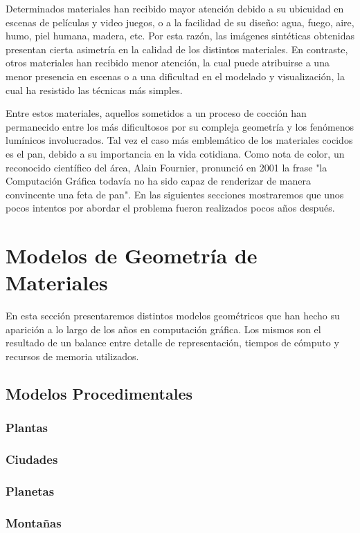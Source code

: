 Determinados materiales han recibido mayor atención debido a su ubicuidad en escenas de películas y video juegos, o a la facilidad de su diseño: agua, fuego, aire, humo, piel humana, madera, etc. Por esta razón, las imágenes sintéticas obtenidas presentan cierta asimetría en la calidad de los distintos materiales. En contraste, otros materiales han recibido menor atención, la cual puede atribuirse a una menor presencia en escenas o a una dificultad en el modelado y visualización, la cual ha resistido las técnicas más simples.

Entre estos materiales, aquellos sometidos a un proceso de cocción han permanecido entre los más dificultosos por su compleja geometría y los fenómenos lumínicos involucrados. Tal vez el caso más emblemático de los materiales cocidos es el pan, debido a su importancia en la vida cotidiana. Como nota de color, un reconocido  científico del área, Alain Fournier, pronunció en 2001 la frase "la Computación Gráfica todavía no ha sido capaz de renderizar de manera convincente una feta de pan". En las siguientes secciones mostraremos que unos pocos intentos por abordar el problema fueron realizados pocos años después.

\section{Modelos de Geometría de Materiales}
En esta sección presentaremos distintos modelos geométricos que han hecho su aparición a lo largo de los años en computación gráfica. Los mismos son el resultado de un balance entre detalle de representación, tiempos de cómputo y recursos de memoria utilizados.

\subsection{Modelos Procedimentales}
\subsubsection{Plantas}
\subsubsection{Ciudades}
\subsubsection{Planetas}
\subsubsection{Montañas}



